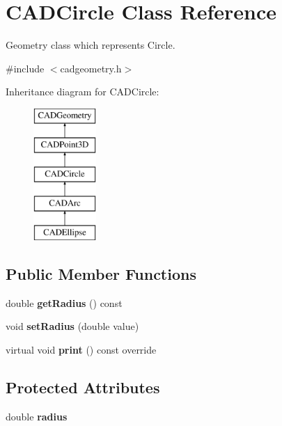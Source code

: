 \hypertarget{class_c_a_d_circle}{}\section{C\+A\+D\+Circle Class Reference}
\label{class_c_a_d_circle}


Geometry class which represents Circle.  




{\ttfamily \#include $<$cadgeometry.\+h$>$}

Inheritance diagram for C\+A\+D\+Circle\+:\begin{figure}[H]
\begin{center}
\leavevmode
\includegraphics[height=5.000000cm]{class_c_a_d_circle}
\end{center}
\end{figure}
\subsection*{Public Member Functions}
\begin{DoxyCompactItemize}
\item 
double {\bfseries get\+Radius} () const \hypertarget{class_c_a_d_circle_afe58ed942729116553e6c3b7358d9eef}{}\label{class_c_a_d_circle_afe58ed942729116553e6c3b7358d9eef}

\item 
void {\bfseries set\+Radius} (double value)\hypertarget{class_c_a_d_circle_a9d62f92c59e13a9c4d9040c48fe319d6}{}\label{class_c_a_d_circle_a9d62f92c59e13a9c4d9040c48fe319d6}

\item 
virtual void {\bfseries print} () const  override\hypertarget{class_c_a_d_circle_a54f3a34787218b7c29b63d376c878b3f}{}\label{class_c_a_d_circle_a54f3a34787218b7c29b63d376c878b3f}

\end{DoxyCompactItemize}
\subsection*{Protected Attributes}
\begin{DoxyCompactItemize}
\item 
double {\bfseries radius}\hypertarget{class_c_a_d_circle_a56ecff7d4adf6d40712afc83e0d0216d}{}\label{class_c_a_d_circle_a56ecff7d4adf6d40712afc83e0d0216d}

\end{DoxyCompactItemize}

